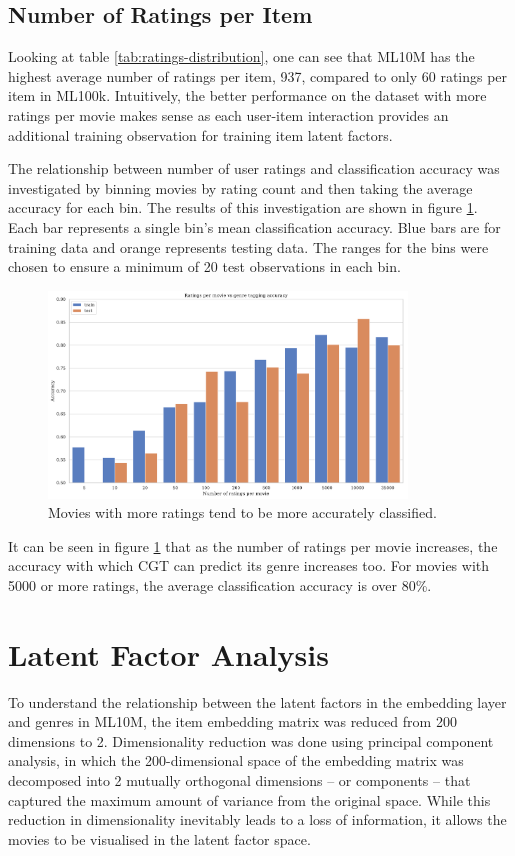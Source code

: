 \subsection{Number of Ratings per Item}
Looking at table \ref{tab:ratings-distribution}, one can see that ML10M has the highest average number of ratings per item, 937, compared to only 60 ratings per item in ML100k. Intuitively, the better performance on the dataset with more ratings per movie makes sense as each user-item interaction provides an additional training observation for training item latent factors.

The relationship between number of user ratings and classification accuracy was investigated by binning movies by rating count and then taking the average accuracy for each bin. The results of this investigation are shown in figure \ref{fig:5-ratings-vs-acc}. Each bar represents a single bin's mean classification accuracy. Blue bars are for training data and orange represents testing data. The ranges for the bins were chosen to ensure a minimum of 20 test observations in each bin.

\begin{figure}[H]
\centering
\includegraphics[width=0.85\textwidth]{Figures/5_ml10m-ratings-vs-acc.pdf}
\decoRule
\caption[Number of ratings vs accuracy]{Movies with more ratings tend to be more accurately classified.}
\label{fig:5-ratings-vs-acc}
\end{figure}

It can be seen in figure \ref{fig:5-ratings-vs-acc} that as the number of ratings per movie increases, the accuracy with which CGT can predict its genre increases too. For movies with 5000 or more ratings, the average classification accuracy is over 80\%.

\section{Latent Factor Analysis}
To understand the relationship between the latent factors in the embedding layer and genres in ML10M, the item embedding matrix was reduced from 200 dimensions to 2. Dimensionality reduction was done using principal component analysis, in which the 200-dimensional space of the embedding matrix was decomposed into 2 mutually orthogonal dimensions -- or components -- that captured the maximum amount of variance from the original space. While this reduction in dimensionality inevitably leads to a loss of information, it allows the movies to be visualised in the latent factor space.

